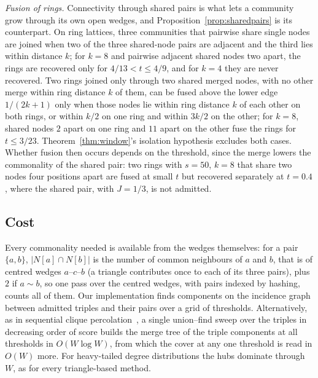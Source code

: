 \emph{Fusion of rings.} Connectivity through shared pairs is what lets a community grow
through its own open wedges, and Proposition~\ref{prop:sharedpairs} is its counterpart.
On ring lattices, three communities that pairwise share single
nodes are joined when two of the three shared-node pairs are adjacent and the third lies
within distance $k$; for $k=8$ and pairwise adjacent shared nodes two apart, the rings
are recovered only for $4/13<t\le4/9$, and for $k=4$ they are never recovered. Two rings
joined only through two shared merged nodes, with no other merge within ring distance
$k$ of them, can be fused above the lower edge $1/(2k+1)$ only when those nodes lie
within ring distance $k$ of each other on both rings, or within $k/2$ on one ring and
within $3k/2$ on the other; for $k=8$, shared nodes $2$ apart on one ring and $11$ apart
on the other fuse the rings for $t\le3/23$. Theorem~\ref{thm:window}'s isolation
hypothesis excludes both cases. Whether fusion then occurs depends on the threshold,
since the merge lowers the commonality of the shared pair: two rings with $s=50$, $k=8$
that share two nodes four positions apart are fused at small $t$ but recovered
separately at $t=0.4$, where the shared pair, with $J=1/3$, is not admitted.

\subsection{Cost}

Every commonality needed is available from the wedges themselves: for a pair $\{a,b\}$,
$|N[a]\cap N[b]|$ is the number of common neighbours of $a$ and $b$, that is of centred
wedges $a$--$c$--$b$ (a triangle contributes once to each of its three pairs), plus $2$
if $a\sim b$, so one pass over the centred wedges, with pairs indexed by hashing, counts
all of them. Our implementation finds components on the incidence graph between admitted
triples and their pairs over a grid of thresholds. Alternatively, as in sequential clique
percolation~\cite{kumpula2008sequential}, a single union--find sweep over the triples in
decreasing order of score builds the merge tree of the triple components at all
thresholds in $O(W\log W)$, from which the cover at any one threshold is read in $O(W)$
more. For heavy-tailed degree distributions the hubs dominate through $W$, as for
every triangle-based method.

